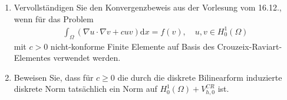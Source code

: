 
\begin{exercise}

\phantom{}

\begin{enumerate}[label = \textbf{\alph*)}]
  \item Vervollständigen Sie den Konvergenzbeweis aus der Vorlesung vom 16.12.,
  wenn für das Problem
  \begin{align}
    \int_\Omega (\nabla u \cdot \nabla v + cuv) \mathrm{d}x = f(v),
    \quad u,v \in H_0^1(\Omega)
  \end{align}
  mit $c > 0$ nicht-konforme Finite Elemente auf Basis des Crouzeix-Raviart-Elementes
  verwendet werden.
  \item Beweisen Sie, dass für $c \geq 0$ die durch die diskrete Bilinearform
  induzierte diskrete Norm tatsächlich ein Norm auf $H_0^1(\Omega) + V_{h,0}^{CR}$
  ist.
\end{enumerate}
\end{exercise}


\begin{solution}

\phantom{}

\end{solution}


